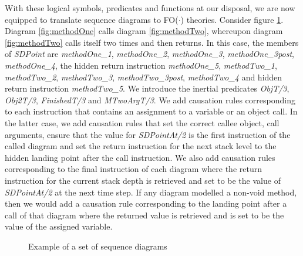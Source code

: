 \documentclass[conference]{IEEEtran}
\begin{document}
With these logical symbols, predicates and functions at our disposal, we are now equipped to translate sequence diagrams to FO($\cdot$) theories. Consider figure \ref{fig:recursion}. Diagram \ref{fig:methodOne} calls diagram \ref{fig:methodTwo}, whereupon diagram \ref{fig:methodTwo} calls itself two times and then returns. In this case, the members of \textit{SDPoint} are \textit{methodOne\_1}, \textit{methodOne\_2}, \textit{methodOne\_3}, \textit{methodOne\_3post}, \textit{methodOne\_4}, the hidden return instruction \textit{methodOne\_5}, \textit{methodTwo\_1}, \textit{methodTwo\_2}, \textit{methodTwo\_3}, \textit{methodTwo\_3post}, \textit{methodTwo\_4} and hidden return instruction \textit{methodTwo\_5}. We introduce the inertial predicates \textit{ObjT/3}, \textit{Obj2T/3}, \textit{FinishedT/3} and \textit{MTwoArgT/3}. We add causation rules corresponding to each instruction that contains an assignment to a variable or an object call. In the latter case, we add causation rules that set the correct callee object, call arguments, ensure that the value for \textit{SDPointAt/2} is the first instruction of the called diagram and set the return instruction for the next stack level to the hidden landing point after the call instruction. We also add causation rules corresponding to the final instruction of each diagram where the return instruction for the current stack depth is retrieved and set to be the value of \textit{SDPointAt/2} at the next time step. If any diagram modelled a non-void method, then we would add a causation rule corresponding to the landing point after a call of that diagram where the returned value is retrieved and is set to be the value of the assigned variable.

\begin{figure}[!t]
\centering
{}
\hfil
{}
\caption{Example of a set of sequence diagrams}
\label{fig:recursion}
\end{figure}
\end{document}
